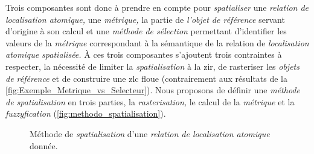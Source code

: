 
Trois composantes sont donc à prendre en compte pour
\emph{spatialiser} une \emph{relation de localisation atomique,} une
\emph{métrique,} la partie de \emph{l'objet de référence} servant
d'origine à son calcul et une \emph{méthode de sélection} permettant
d'identifier les valeurs de la \emph{métrique} correspondant à la
sémantique de la relation de \emph{localisation atomique spatialisée.}
À ces trois composantes s'ajoutent trois contraintes à respecter, la
nécessité de limiter la \emph{spatialisation} à la \ac{zir}, de
rasteriser les \emph{objets de référence} et de construire une
\ac{zlc} floue (contrairement aux résultats de la
\autoref{fig:Exemple_Metrique_vs_Selecteur}). Nous proposons de
définir une \emph{méthode de spatialisation} en trois parties, la
\emph{rasterisation,} le calcul de la \emph{métrique} et la
\emph{fuzzyfication} (\autoref{fig:methodo_spatialisation}).

\begin{figure}
  \centering
  
  \caption{Méthode de \emph{spatialisation} d'une \emph{relation de
      localisation atomique} donnée.}
  \label{fig:methodo_spatialisation}
\end{figure}

